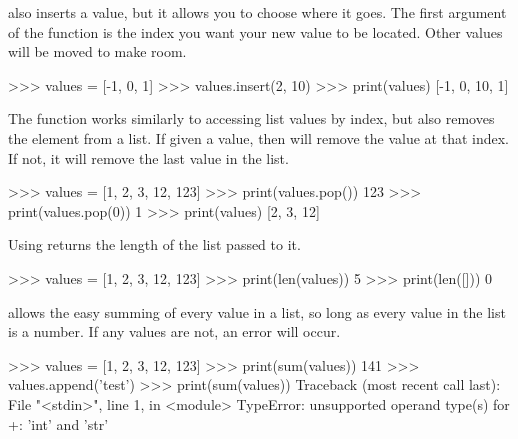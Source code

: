 \documentclass[11pt]{cselabheader}
\begin{document}
 also inserts a value, but it allows you to choose where it
goes. The first argument of the function is the index you want your new value to
be located. Other values will be moved to make room.

\begin{pyconcode}
>>> values = [-1, 0, 1]
>>> values.insert(2, 10)
>>> print(values)
[-1, 0, 10, 1]
\end{pyconcode}

The  function works similarly to accessing list values by
index, but also removes the element from a list. If given a value, then
 will remove the value at that index. If not, it will remove
the last value in the list.

\begin{pyconcode}
>>> values = [1, 2, 3, 12, 123]
>>> print(values.pop())
123
>>> print(values.pop(0))
1
>>> print(values)
[2, 3, 12]
\end{pyconcode}

Using  returns the length of the list passed to it.

\begin{pyconcode}
>>> values = [1, 2, 3, 12, 123]
>>> print(len(values))
5
>>> print(len([]))
0
\end{pyconcode}

 allows the easy summing of every value in a list, so long as
every value in the list is a number. If any values are not, an error will occur.

\begin{pyconcode}
>>> values = [1, 2, 3, 12, 123]
>>> print(sum(values))
141
>>> values.append('test')
>>> print(sum(values))
Traceback (most recent call last):
  File "<stdin>", line 1, in <module>
TypeError: unsupported operand type(s) for +: 'int' and 'str'
\end{pyconcode}
\end{document}
